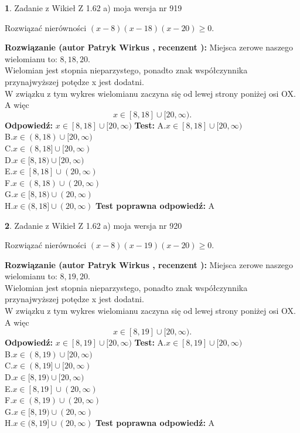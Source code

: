 \documentclass[12pt, a4paper]{article}
\theoremstyle{definition} %
\newtheorem{zad}{}
\newcommand{\zadStart}[1]{\begin{zad}#1\newline}
\newcommand{\zadStop}{\end{zad}}
\newcommand{\rozwStart}[2]{\noindent \textbf{Rozwiązanie (autor #1 , recenzent #2): }\newline}
\newcommand{\rozwStop}{\newline}
\newcommand{\odpStart}{\noindent \textbf{Odpowiedź:}\newline}
\newcommand{\odpStop}{\newline}
\newcommand{\testStart}{\noindent \textbf{Test:}\newline}
\newcommand{\testStop}{\newline}
\newcommand{\kluczStart}{\noindent \textbf{Test poprawna odpowiedź:}\newline}
\newcommand{\kluczStop}{\newline}
\begin{document}
\zadStart{Zadanie z Wikieł Z 1.62 a) moja wersja nr 919}

Rozwiązać nierówności $(x-8)(x-18)(x-20)\ge0$.
\zadStop
\rozwStart{Patryk Wirkus}{}
Miejsca zerowe naszego wielomianu to: $8, 18, 20$.\\
Wielomian jest stopnia nieparzystego, ponadto znak współczynnika przy\linebreak najwyższej potędze x jest dodatni.\\ W związku z tym wykres wielomianu zaczyna się od lewej strony poniżej osi OX. A więc $$x \in [8,18] \cup [20,\infty).$$
\rozwStop
\odpStart
$x \in [8,18] \cup [20,\infty)$
\odpStop
\testStart
A.$x \in [8,18] \cup [20,\infty)$\\
B.$x \in (8,18) \cup [20,\infty)$\\
C.$x \in (8,18] \cup [20,\infty)$\\
D.$x \in [8,18) \cup [20,\infty)$\\
E.$x \in [8,18] \cup (20,\infty)$\\
F.$x \in (8,18) \cup (20,\infty)$\\
G.$x \in [8,18) \cup (20,\infty)$\\
H.$x \in (8,18] \cup (20,\infty)$
\testStop
\kluczStart
A
\kluczStop



\zadStart{Zadanie z Wikieł Z 1.62 a) moja wersja nr 920}

Rozwiązać nierówności $(x-8)(x-19)(x-20)\ge0$.
\zadStop
\rozwStart{Patryk Wirkus}{}
Miejsca zerowe naszego wielomianu to: $8, 19, 20$.\\
Wielomian jest stopnia nieparzystego, ponadto znak współczynnika przy\linebreak najwyższej potędze x jest dodatni.\\ W związku z tym wykres wielomianu zaczyna się od lewej strony poniżej osi OX. A więc $$x \in [8,19] \cup [20,\infty).$$
\rozwStop
\odpStart
$x \in [8,19] \cup [20,\infty)$
\odpStop
\testStart
A.$x \in [8,19] \cup [20,\infty)$\\
B.$x \in (8,19) \cup [20,\infty)$\\
C.$x \in (8,19] \cup [20,\infty)$\\
D.$x \in [8,19) \cup [20,\infty)$\\
E.$x \in [8,19] \cup (20,\infty)$\\
F.$x \in (8,19) \cup (20,\infty)$\\
G.$x \in [8,19) \cup (20,\infty)$\\
H.$x \in (8,19] \cup (20,\infty)$
\testStop
\kluczStart
A
\kluczStop
\end{document}

